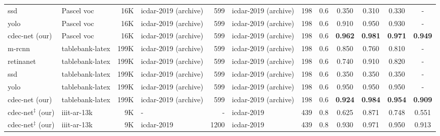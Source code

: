 \documentclass[a4paper,conference]{IEEEtran}
\begin{document}
\begin{table*}
\begin{center}
\begin{tabular}{|l| l | r|l |r|l|r| c| c c c c|}
{\sc ssd}~\cite{casado2019benefits} &Pascel {\sc voc} &16K &{\sc icdar}-2019 (archive) &599 &{\sc icdar}-2019 (archive) &198 &0.6 &0.350 &0.310 &0.330 &- \\
{\sc yolo}~\cite{casado2019benefits} &Pascel {\sc voc} &16K &{\sc icdar}-2019 (archive) &599 &{\sc icdar}-2019 (archive) &198 &0.6 &0.910 &0.950 &0.930 &- \\ 
{\sc cd}e{\sc c-n}et (our) &Pascel {\sc voc} &16K &{\sc icdar}-2019 (archive) &599 &{\sc icdar}-2019 (archive) &198 &0.6 &\textbf{0.962} &\textbf{0.981} &\textbf{0.971} &\textbf{0.949} \\ 
\hhline{|=|=|=|=|=|=|=|=|====|} 
{\sc m-rcnn}~\cite{casado2019benefits} &{\sc t}able{\sc b}ank-{\sc l}a{\sc t}e{\sc x} &199K &{\sc icdar}-2019 (archive) &599 &{\sc icdar}-2019 (archive) &198 &0.6 &0.850 &0.760 &0.810 &- \\ 
{\sc r}etina{\sc n}et~\cite{casado2019benefits} &{\sc t}able{\sc b}ank-{\sc l}a{\sc t}e{\sc x} &199K &{\sc icdar}-2019 (archive) &599 &{\sc icdar}-2019 (archive) &198 &0.6 &0.740 &0.910 &0.820 &- \\ 
{\sc ssd}~\cite{casado2019benefits} &{\sc t}able{\sc b}ank-{\sc l}a{\sc t}e{\sc x} &199K &{\sc icdar}-2019 (archive) &599 &{\sc icdar}-2019 (archive) &198 &0.6 &0.350 &0.350 &0.350 &- \\ 
{\sc yolo}~\cite{casado2019benefits} &{\sc t}able{\sc b}ank-{\sc l}a{\sc t}e{\sc x} &199K &{\sc icdar}-2019 (archive) &599 &{\sc icdar}-2019 (archive) &198 &0.6 &0.950 &0.950 &0.950 &- \\  
{\sc cd}e{\sc c-n}et (our) &{\sc t}able{\sc b}ank-{\sc l}a{\sc t}e{\sc x} &199K &{\sc icdar}-2019 (archive) &599 &{\sc icdar}-2019 (archive) &198 &0.6 &\textbf{0.924} &\textbf{0.984} &\textbf{0.954} &\textbf{0.909} \\ \hhline{|=|=|=|=|=|=|=|=|====|}
{\sc cd}e{\sc c-n}et$^{\ddagger}$ (our) &{\sc iiit-ar-13k} &9K &- &- &{\sc icdar}-2019 &439 &0.8 & 0.625 &0.871 &0.748 &0.551 \\
{\sc cd}e{\sc c-n}et$^{\ddagger}$ (our) &{\sc iiit-ar-13k} &9K &{\sc icdar}-2019 &1200 &{\sc icdar}-2019 &439 &0.8 &0.930 &0.971 &0.950 &0.913 \\ \hline
\end{tabular}
\end{center}
\caption{Illustrates comparison between the proposed {\sc cd}e{\sc c-n}et and state-of-the-art techniques on {\sc icdar-2019} dataset. {\sc cd}e{\sc c-n}et$^{\ddagger}$\textbf{:} indicates a single  model which is trained with {\sc iiit-ar-13k} dataset. \label{table_icdar_2019}}
\end{table*}
\end{document}
